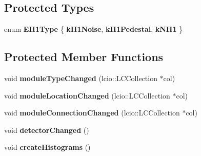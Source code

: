 \subsection*{Protected Types}
\begin{DoxyCompactItemize}
\item 
enum {\bfseries E\-H1\-Type} \{ {\bfseries k\-H1\-Noise}, 
{\bfseries k\-H1\-Pedestal}, 
{\bfseries k\-N\-H1}
 \}
\end{DoxyCompactItemize}
\subsection*{Protected Member Functions}
\begin{DoxyCompactItemize}
\item 
void {\bfseries module\-Type\-Changed} (lcio\-::\-L\-C\-Collection $\ast$col)\label{classCALICE_1_1PedestalNoiseHistograms_a2e3c07637bf5c56983d397633da2088c}

\item 
void {\bfseries module\-Location\-Changed} (lcio\-::\-L\-C\-Collection $\ast$col)\label{classCALICE_1_1PedestalNoiseHistograms_a19422319fb37675b47ed8b75c751c518}

\item 
void {\bfseries module\-Connection\-Changed} (lcio\-::\-L\-C\-Collection $\ast$col)\label{classCALICE_1_1PedestalNoiseHistograms_a45a6819f1ecd53413ea4c3384130f956}

\item 
void {\bfseries detector\-Changed} ()\label{classCALICE_1_1PedestalNoiseHistograms_a9c381457a97f7d6a5719c106cfe22470}

\item 
void {\bfseries create\-Histograms} ()\label{classCALICE_1_1PedestalNoiseHistograms_a12ca8d443b6eaaaabdf30d6ab744cd77}

\end{DoxyCompactItemize}
